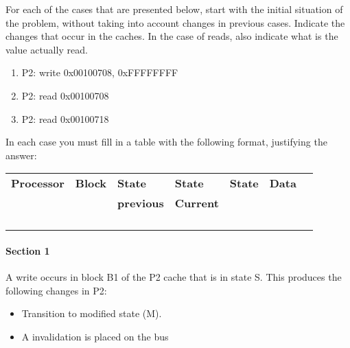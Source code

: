 \medskip

For each of the cases that are presented below, start with the
initial situation of the problem, without taking into account changes in
previous cases. Indicate the changes that occur in the caches. 
In the case of reads, also indicate what is the value actually read.


\begin{enumerate}
  \item P2: write 0x00100708, 0xFFFFFFFF
  \item P2: read 0x00100708
  \item P2: read 0x00100718
\end{enumerate}

In each case you must fill in a table with the following format,
justifying the answer:

\begin{tabular}{|l|l|l|l|l|l|p{2cm}|p{2cm}|}

\hline
\textbf{Processor} &
\textbf{Block} &
\textbf{State} &
\textbf{State} &
\textbf{State} &
\multicolumn{2}{|c|}{\textbf{Data}}
\\

&
&
\textbf{previous} &
\textbf{Current} &
&
\multicolumn{2}{|c|}{}
\\
\hline
\hline

& & & & & \multicolumn{1}{|p{2cm}|}{} & \\
\hline
& & & & & \multicolumn{1}{|p{2cm}|}{} & \\
\hline
& & & & & \multicolumn{1}{|p{2cm}|}{} & \\
\hline
& & & & & \multicolumn{1}{|p{2cm}|}{} & \\
\hline
\end{tabular}

\begin{acsolution}\end{acsolution}


\paragraph{Section 1}

A write occurs in block B1 of the P2 cache that is in
state S. This produces the following changes in P2:


\begin{itemize}

\item Transition to modified state (M).

\item A invalidation is placed on the bus

\end{itemize}

